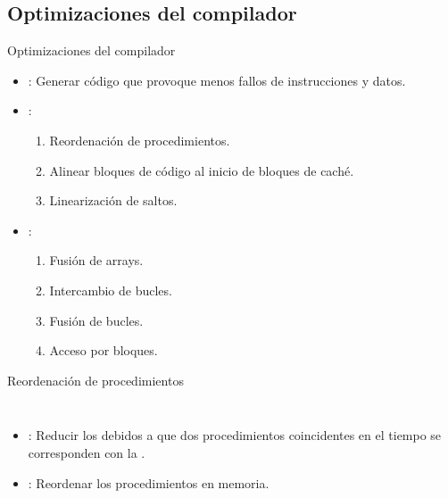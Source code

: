 \subsection{Optimizaciones del compilador}

\begin{frame}[t]{Optimizaciones del compilador}
\begin{itemize}
  \item {}:
        Generar código que provoque menos fallos de 
        instrucciones y datos.

  \item {}: 
    \begin{enumerate}[1.]
      \item Reordenación de procedimientos.
      \item Alinear bloques de código al inicio de bloques de caché.
      \item Linearización de saltos.
    \end{enumerate}

  \item {}: 
    \begin{enumerate}[1.]
      \item Fusión de arrays.
      \item Intercambio de bucles.
      \item Fusión de bucles.
      \item Acceso por bloques.
    \end{enumerate}
\end{itemize}
\end{frame}

\begin{frame}[t]{Reordenación de procedimientos}
\begin{columns}


\begin{itemize}
  \item {}: Reducir los  debidos a que 
        dos procedimientos coincidentes en el tiempo se corresponden 
        con la .

  \item {}: Reordenar los procedimientos en memoria.

\end{itemize}

\pause


\end{columns}
\end{frame}

